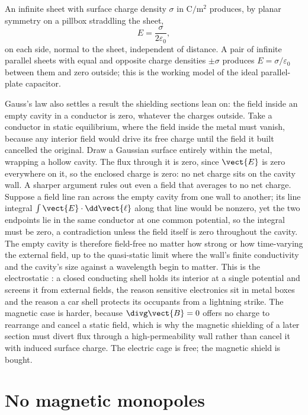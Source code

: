 An infinite sheet with surface charge density $\sigma$ in $\si{\coulomb
\per\meter\squared}$ produces, by planar symmetry on a pillbox
straddling the sheet,
\[
E = \frac{\sigma}{2\varepsilon_{0}},
\]
on each side, normal to the sheet, independent of distance. A pair of
infinite parallel sheets with equal and opposite charge densities
$\pm\sigma$ produces $E = \sigma/\varepsilon_{0}$ between them and zero
outside; this is the working model of the ideal parallel-plate
capacitor.

Gauss's law also settles a result the shielding sections lean on: the field
inside an empty cavity in a conductor is zero, whatever the charges outside.
Take a conductor in static equilibrium, where the field inside the metal must
vanish, because any interior field would drive its free charge until the field
it built cancelled the original. Draw a Gaussian surface entirely within the
metal, wrapping a hollow cavity. The flux through it is zero, since $\vect{E}$
is zero everywhere on it, so the enclosed charge is zero: no net charge sits
on the cavity wall. A sharper argument rules out even a field that averages to
no net charge. Suppose a field line ran across the empty cavity from one wall
to another; its line integral $\int\vect{E}\cdot\dd\vect{\ell}$ along that
line would be nonzero, yet the two endpoints lie in the same conductor at one
common potential, so the integral must be zero, a contradiction unless the
field itself is zero throughout the cavity. The empty cavity is therefore
field-free no matter how strong or how time-varying the external field, up to
the quasi-static limit where the wall's finite conductivity and the cavity's
size against a wavelength begin to matter. This is the electrostatic
: a closed conducting shell holds its interior at a
single potential and screens it from external fields, the reason sensitive
electronics sit in metal boxes and the reason a car shell protects its
occupants from a lightning strike. The magnetic case is harder, because
$\divg\vect{B} = 0$ offers no charge to rearrange and cancel a static field,
which is why the magnetic shielding of a later section must divert flux through
a high-permeability wall rather than cancel it with induced surface charge.
The electric cage is free; the magnetic shield is bought.

\section{No magnetic monopoles}


